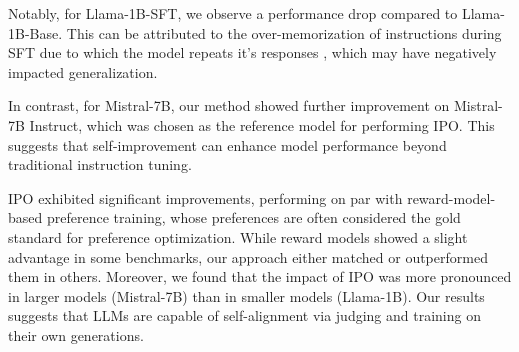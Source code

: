 Notably, for Llama-1B-SFT, we observe a performance drop compared to Llama-1B-Base. This can be attributed to the over-memorization of instructions during SFT \citep{zhang2025best,chu2025sft,kirk2023understanding} due to which the model repeats it's responses \citep{hiraoka2024repetition}, which may have negatively impacted generalization.

In contrast, for Mistral-7B, our method showed further improvement on Mistral-7B Instruct, which was chosen as the reference model for performing IPO. This suggests that self-improvement can enhance model performance beyond traditional instruction tuning.

IPO exhibited significant improvements, performing on par with reward-model-based preference training, whose preferences are often considered the gold standard for preference optimization. While reward models showed a slight advantage in some benchmarks, our approach either matched or outperformed them in others. Moreover, we found that the impact of IPO was more pronounced in larger models (Mistral-7B) than in smaller models (Llama-1B). Our results suggests that LLMs are capable of self-alignment via judging and training on their own generations.



